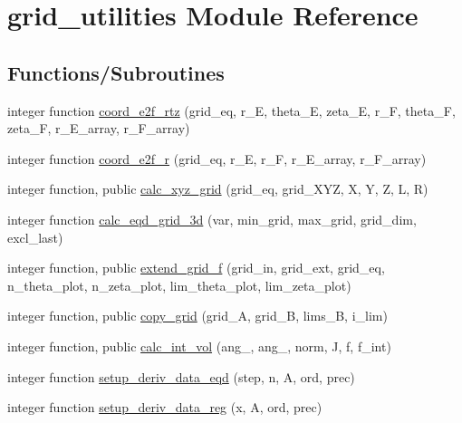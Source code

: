 \hypertarget{namespacegrid__utilities}{}\section{grid\+\_\+utilities Module Reference}
\label{namespacegrid__utilities}
\subsection*{Functions/\+Subroutines}
\begin{DoxyCompactItemize}
\item 
integer function \hyperlink{namespacegrid__utilities_a2a3c0509679b438d9d5aa5bedfb7a7b8}{coord\+\_\+e2f\+\_\+rtz} (grid\+\_\+eq, r\+\_\+E, theta\+\_\+E, zeta\+\_\+E, r\+\_\+F, theta\+\_\+F, zeta\+\_\+F, r\+\_\+\+E\+\_\+array, r\+\_\+\+F\+\_\+array)
\item 
integer function \hyperlink{namespacegrid__utilities_a7866b2c198255dec7904dac73ccf4340}{coord\+\_\+e2f\+\_\+r} (grid\+\_\+eq, r\+\_\+E, r\+\_\+F, r\+\_\+\+E\+\_\+array, r\+\_\+\+F\+\_\+array)
\item 
integer function, public \hyperlink{namespacegrid__utilities_a39e7cd9b8f173994358dbdd6b57827e1}{calc\+\_\+xyz\+\_\+grid} (grid\+\_\+eq, grid\+\_\+\+X\+YZ, X, Y, Z, L, R)
\item 
integer function \hyperlink{namespacegrid__utilities_a1725fdd7bdf52d436152c5e327c36be4}{calc\+\_\+eqd\+\_\+grid\+\_\+3d} (var, min\+\_\+grid, max\+\_\+grid, grid\+\_\+dim, excl\+\_\+last)
\item 
integer function, public \hyperlink{namespacegrid__utilities_a414a1a11924bc935afca3a89fc31f2f5}{extend\+\_\+grid\+\_\+f} (grid\+\_\+in, grid\+\_\+ext, grid\+\_\+eq, n\+\_\+theta\+\_\+plot, n\+\_\+zeta\+\_\+plot, lim\+\_\+theta\+\_\+plot, lim\+\_\+zeta\+\_\+plot)
\item 
integer function, public \hyperlink{namespacegrid__utilities_a04f971c38083f873a04eb6568bed466b}{copy\+\_\+grid} (grid\+\_\+A, grid\+\_\+B, lims\+\_\+B, i\+\_\+lim)
\item 
integer function, public \hyperlink{namespacegrid__utilities_a97e3106dbdc10b726af74afa113ba533}{calc\+\_\+int\+\_\+vol} (ang\+\_, ang\+\_, norm, J, f, f\+\_\+int)
\item 
integer function \hyperlink{namespacegrid__utilities_a32f5edd35f6976236b9848f56f951c83}{setup\+\_\+deriv\+\_\+data\+\_\+eqd} (step, n, A, ord, prec)
\item 
integer function \hyperlink{namespacegrid__utilities_a383fb7484b5a315a3b8019d388f88617}{setup\+\_\+deriv\+\_\+data\+\_\+reg} (x, A, ord, prec)

\end{DoxyCompactItemize}
